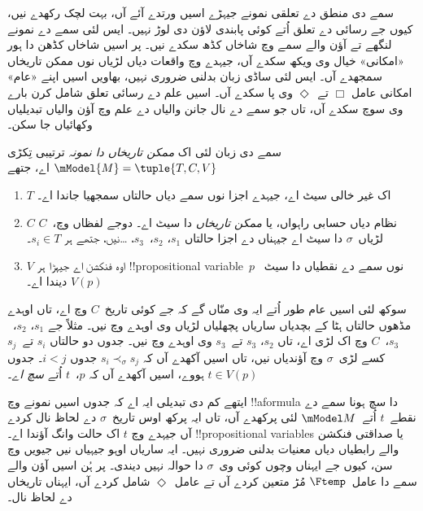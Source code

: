 \documentclass[../../../include/open-logic-section]{subfiles}
\begin{document}


سمے دی منطق دے تعلقی نمونے جیہڑے اسیں ورتدے آئے آں، بہت لچک
رکھدے نیں، کیوں جے رسائی دے تعلق اُتے کوئی پابندی لاؤن دی لوڑ نہیں۔
ایس لئی سمے دے نمونے لنگھے تے آؤن والے سمے وچ شاخاں کڈھ سکدے نیں۔
پر اسیں شاخاں کڈھن دا ہور «امکانی» خیال وی ویکھ سکدے آں، جیہدے وچ
واقعات دیاں لڑیاں نوں ممکن تاریخاں سمجھدے آں۔ ایس لئی ساڈی زبان
بدلنی ضروری نہیں، بھاویں اسیں اپنے «عام» امکانی عامل $\Box$ تے~$\Diamond$
وی پا سکدے آں۔ اسیں علم دے رسائی تعلق شامل کرن بارے وی سوچ سکدے
آں، تاں جو سمے دے نال جانن والیاں دے علم وچ آؤن والیاں تبدیلیاں
وکھائیاں جا سکن۔

\begin{defn}
  سمے دی زبان لئی اک \emph{ممکن تاریخاں دا نمونہ} ترتیبی تِکڑی
  $\mModel{M} = \tuple{T, C, V}$ اے، جتھے
  \begin{enumerate}
    \item $T$ اک غیر خالی سیٹ اے، جیہدے اجزا نوں سمے دیاں حالتاں
      سمجھیا جاندا اے۔
    \item $C$ نظام دیاں حسابی راہواں، یا \emph{ممکن تاریخاں} دا سیٹ اے۔
      دوجے لفظاں وچ،~$C$ لڑیاں~$\sigma$ دا سیٹ اے جیہناں دے
      اجزا حالتاں $s_1$، $s_2$،~$s_3$، \dots نیں، جتھے ہر $s_i \in T$۔
    \item $V$ اوہ فنکشن اے جیہڑا ہر !!{propositional
      variable}~$p$ نوں سمے دے نقطیاں دا سیٹ~$V(p)$ دیندا اے۔
  \end{enumerate}
  سوکھ لئی اسیں عام طور اُتے ایہ وی منّاں گے کہ جے کوئی تاریخ~$C$
  وچ اے، تاں اوہدے مڈھوں حالتاں ہٹا کے بچدیاں ساریاں پچھلیاں لڑیاں
  وی اوہدے وچ نیں۔ مثلاً جے $s_1$، $s_2$،~$s_3$،~$C$ وچ اک لڑی اے،
  تاں $s_2$، $s_3$ تے~$s_3$ وی اوہدے وچ نیں۔ جدوں دو حالتاں $s_i$
  تے~$s_j$ کسے لڑی~$\sigma$ وچ آؤندیاں نیں، تاں اسیں آکھدے آں
  کہ $s_i \prec_\sigma s_j$ جدوں $i < j$۔
  جدوں $t \in V(p)$ ہووے، اسیں آکھدے آں کہ $p$،~$t$ اُتے \emph{سچ اے}۔
\end{defn}

ایتھے کم دی تبدیلی ایہ اے کہ جدوں اسیں نمونے وچ !!a{formula} دا
سچ ہونا سمے دے نقطے~$t$ اُتے~$\mModel M$ لئی پرکھدے آں، تاں
ایہ پرکھ اوس تاریخ~$\sigma$ دے لحاظ نال کردے آں جیہدے وچ $t$
اک حالت وانگ آؤندا اے۔ !!{propositional
variable}s یا صداقتی فنکشن والے رابطیاں دیاں معنیات بدلنی ضروری
نہیں۔ ایہ ساریاں اوہو جیہیاں نیں جیویں 
وچ سن، کیوں جے ایہناں وچوں کوئی وی~$\sigma$ دا حوالہ نہیں دیندی۔
پر ہُن اسیں آؤن والے سمے دا عامل~$\Ftemp$ مُڑ متعین کردے آں تے
عامل~$\Diamond$ شامل کردے آں، ایہناں تاریخاں دے لحاظ نال۔
\end{document}
